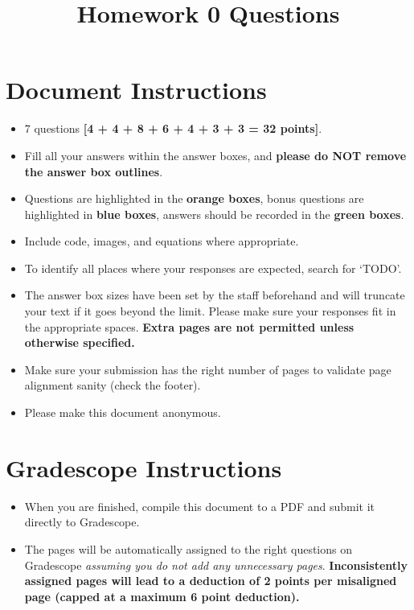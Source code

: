 \documentclass[11pt]{article}
\date{}
\title{\vspace{-1cm}Homework 0 Questions}
\begin{document}
\maketitle
\vspace{-3cm}
\thispagestyle{fancy}

\section*{ Document Instructions}
\begin{itemize}

  \item 7 questions \textbf{[4 + 4 + 8 + 6 + 4 + 3 + 3 = 32 points]}.
  \item Fill all your answers within the answer boxes, and \textbf{please do NOT remove the answer box outlines}.
  \item Questions are highlighted in the \textbf{orange boxes}, bonus questions are highlighted in \textbf{blue boxes}, answers should be recorded in the \textbf{green boxes}.
  \item Include code, images, and equations where appropriate.
  \item To identify all places where your responses are expected, search for `TODO'.
  \item The answer box sizes have been set by the staff beforehand and will truncate your text if it goes beyond the limit. Please make sure your responses fit in the appropriate spaces. \textbf{Extra pages are not permitted unless otherwise specified.}
  \item Make sure your submission has the right number of pages to validate page alignment sanity (check the footer).
  \item Please make this document anonymous.
\end{itemize}

\section*{ Gradescope Instructions}
\begin{itemize}
  \item When you are finished, compile this document to a PDF and submit it directly to Gradescope. 
  \item The pages will be automatically assigned to the right questions on Gradescope \textit{assuming you do not add any unnecessary pages}. \textbf{Inconsistently assigned pages will lead to a deduction of 2 points per misaligned page (capped at a maximum 6 point deduction).}
\end{itemize}
\end{document}
